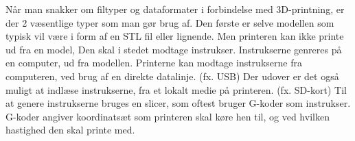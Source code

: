 Når man snakker om filtyper og dataformater i forbindelse med 3D-printning, er der 2 væsentlige typer som man gør brug af. Den første er selve modellen som typisk vil være i form af en STL fil eller lignende. Men printeren kan ikke printe ud fra en model, Den skal i stedet modtage instrukser. Instrukserne genreres på en computer, ud fra modellen. Printerne kan modtage instrukserne fra computeren, ved brug af en direkte datalinje. (fx. USB) Der udover er det også muligt at indlæse instrukserne, fra et lokalt medie på printeren. (fx. SD-kort)
Til at genere instrukserne bruges en slicer, som oftest bruger G-koder som instrukser. G-koder angiver koordinatsæt som printeren skal køre hen til, og ved hvilken hastighed den skal printe med.